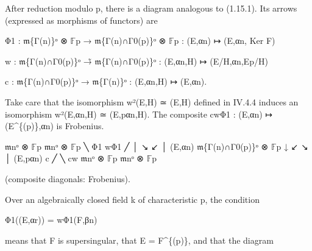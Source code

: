 \documentclass[11pt,a4paper]{article}
\begin{document}
After reduction modulo p, there is a diagram analogous to (1.15.1). Its arrows (expressed as morphisms of functors) are

Φ\textunderscore{}1 : \ensuremath{\mathfrak{m}}\textunderscore{}\{Γ(n)\}ᵒ ⊗ \ensuremath{\mathbb{F}}\textunderscore{}p → \ensuremath{\mathfrak{m}}\textunderscore{}\{Γ(n)∩Γ\textunderscore{}0(p)\}ᵒ ⊗ \ensuremath{\mathbb{F}}\textunderscore{}p : (E,α\textunderscore{}n) ↦ (E,α\textunderscore{}n, Ker F)

w : \ensuremath{\mathfrak{m}}\textunderscore{}\{Γ(n)∩Γ\textunderscore{}0(p)\}ᵒ →̃ \ensuremath{\mathfrak{m}}\textunderscore{}\{Γ(n)∩Γ\textunderscore{}0(p)\}ᵒ : (E,α\textunderscore{}n,H) ↦ (E/H,α\textunderscore{}n,E\textunderscore{}p/H)

c : \ensuremath{\mathfrak{m}}\textunderscore{}\{Γ(n)∩Γ\textunderscore{}0(p)\}ᵒ → \ensuremath{\mathfrak{m}}\textunderscore{}\{Γ(n)\}ᵒ : (E,α\textunderscore{}n,H) ↦ (E,α\textunderscore{}n).

Take care that the isomorphism w²(E,H) ≃ (E,H) defined in IV.4.4 induces an isomorphism w²(E,α\textunderscore{}n,H) ≃ (E,pα\textunderscore{}n,H). The composite cwΦ\textunderscore{}1 : (E,α\textunderscore{}n) ↦ (E\textasciicircum{}\{(p)\},α\textunderscore{}n) is Frobenius.

\ensuremath{\mathfrak{m}}\textunderscore{}nᵒ ⊗ \ensuremath{\mathbb{F}}\textunderscore{}p                         \ensuremath{\mathfrak{m}}\textunderscore{}nᵒ ⊗ \ensuremath{\mathbb{F}}\textunderscore{}p ╲ Φ\textunderscore{}1                   wΦ\textunderscore{}1 ╱ │ ↘                         ↙    │ (E,α\textunderscore{}n) \ensuremath{\mathfrak{m}}\textunderscore{}\{Γ(n)∩Γ\textunderscore{}0(p)\}ᵒ ⊗ \ensuremath{\mathbb{F}}\textunderscore{}p            ↓ ↙                         ↘    │ (E,pα\textunderscore{}n) c ╱                           ╲ cw \ensuremath{\mathfrak{m}}\textunderscore{}nᵒ ⊗ \ensuremath{\mathbb{F}}\textunderscore{}p                         \ensuremath{\mathfrak{m}}\textunderscore{}nᵒ ⊗ \ensuremath{\mathbb{F}}\textunderscore{}p

(composite diagonals: Frobenius).

Over an algebraically closed field k of characteristic p, the condition

Φ\textunderscore{}1((E,α\textunderscore{}r)) = wΦ\textunderscore{}1(F,β\textunderscore{}n)

means that F is supersingular, that E = F\textasciicircum{}\{(p)\}, and that the diagram
\end{document}
